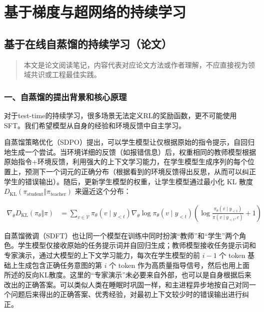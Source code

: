 \hypertarget{ux57faux4e8eux68afux5ea6ux4e0eux8d85ux7f51ux7edcux7684ux6301ux7eedux5b66ux4e60}{%
\chapter{基于梯度与超网络的持续学习}\label{ux57faux4e8eux68afux5ea6ux4e0eux8d85ux7f51ux7edcux7684ux6301ux7eedux5b66ux4e60}}

\hypertarget{ux57faux4e8eux5728ux7ebfux81eaux84b8ux998fux7684ux6301ux7eedux5b66ux4e60ux8bbaux6587}{%
\section{基于在线自蒸馏的持续学习（论文）}\label{ux57faux4e8eux5728ux7ebfux81eaux84b8ux998fux7684ux6301ux7eedux5b66ux4e60ux8bbaux6587}}

\begin{quote}
本文是论文阅读笔记，内容代表对应论文方法或作者理解，不应直接视为领域共识或工程最佳实践。
\end{quote}

\hypertarget{ux4e00ux81eaux84b8ux998fux7684ux63d0ux51faux80ccux666fux548cux6838ux5fc3ux539fux7406}{%
\subsection{一、自蒸馏的提出背景和核心原理}\label{ux4e00ux81eaux84b8ux998fux7684ux63d0ux51faux80ccux666fux548cux6838ux5fc3ux539fux7406}}

对于test-time的持续学习，很多场景无法定义RL的奖励函数，更不可能使用SFT。我们希望模型从自身的经验和环境反馈中自主学习。

自蒸馏策略优化（SDPO）提出，可以学生模型让仅根据原始的指令提示，自回归地生成一个尝试。当环境详细的反馈（如报错信息）后，权重相同的教师模型根据原始指令+环境反馈，利用强大的上下文学习能力，在学生模型生成序列的每个位置上，预测下一个词元的正确分布（根据看到的环境反馈得出反思，从而可以纠正学生的错误输出）。随后，更新学生模型的权重，让学生模型通过最小化 KL 散度 \(D_{\mathrm{KL}}(\pi_{\mathrm{student}}\Vert \pi_{\mathrm{teacher}})\) 来逼近这个分布：

\[
\begin{aligned}
\nabla_\theta D_{\mathrm{KL}}(\pi_\theta \Vert \pi)
&=
\sum_{v \in \mathcal{V}} \pi_\theta(v \mid y_{<t}) \nabla_\theta \log \pi_\theta(v \mid y_{<t})
\left(
\log \frac{\pi_\theta(v \mid y_{<t})}{\pi(v \mid y_{<t}, c)} + 1
\right)
\end{aligned}
\]

自蒸馏微调（SDFT）也让同一个模型在训练中同时扮演``教师''和``学生''两个角色。学生模型仅接收原始的任务提示词并自回归生成；教师模型接收任务提示词和专家演示，通过大模型的上下文学习能力，每次在学生模型的前 \(i-1\) 个 token 基础上生成包含正确任务意图的第 \(i\) 个 token 作为高质量指导信号，然后也用上面所述的反向KL散度。这里的``专家演示''未必要来自外部，也可以是自身根据后来改出的正确答案。可以类似人类在睡眠时巩固一样，和主进程异步地按自己对同一个问题后来得出的正确答案、优秀经验，对最初上下文较少时的错误输出进行纠正。

